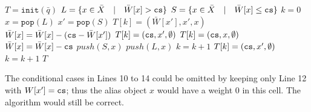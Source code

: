 \begin{algorithm}[htb]
\begin{algorithmic}[1]
            \State $T = \texttt{init}(\bar{q})$ %
            \State $L = \{x \in \bar{X} \quad | \quad \bar{W}[x] > \texttt{cs}\}$ 
            \State $S = \{x \in \bar{X} \quad | \quad \bar{W}[x] \leq \texttt{cs}\}$ 
            \State $k = 0$
                \State $x = \texttt{pop}(L)$ %
                    \State $x' = \texttt{pop}(S)$
                        \State $T[k] = (\bar{W}[x'], x', x)$
                        \State $\bar{W}[x] = \bar{W}[x] - (\texttt{cs} - \bar{W}[x'])$
                    \Else
                        \State $T[k] = (\texttt{cs}, x', \emptyset)$
                    \EndIf
                \Else
                    \State $T[k] = (\texttt{cs}, x, \emptyset)$
                    \State $\bar{W}[x] = \bar{W}[x] - \texttt{cs}$
                \EndIf
                    \State $push(S, x)$ %
                    \State $push(L, x)$
                \EndIf
                \State $k = k + 1$
            \EndWhile
                \State $T[k] = (\texttt{cs}, x', \emptyset)$ 
                \State $k = k + 1$
            \EndFor
            \State \Return $T$
        \EndFunction
	\end{algorithmic}    
 \end{algorithm}

\begin{remark*}
    The conditional cases in Lines 10 to 14 could be omitted by keeping only Line 12 with $W[x']=\texttt{cs}$; thus 
    the alias object $x$ would have a weight 0 in this cell. The algorithm would still be correct.
\end{remark*}


